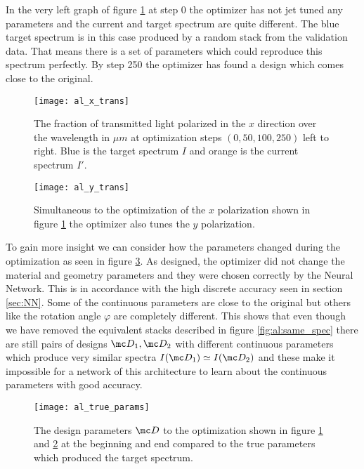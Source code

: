 \indent
In the very left graph of figure \ref{fig:al:x_trans} at step 0 the 
optimizer has not jet tuned any parameters and the current and target spectrum are quite different. The blue target spectrum is in this case produced by a random stack from the validation data. That means there is a set of parameters which could reproduce this spectrum perfectly. By step 250 the optimizer has found a design which comes close to the original.

\begin{figure}[H]
    \centering
    \texttt{[image: al\_x\_trans]}
    \caption{The fraction of transmitted light polarized in the $x$ direction over the wavelength in $\mu m$ at optimization steps 
    $(0, 50, 100, 250)$ left to right. Blue is the target spectrum $I$ and orange is the current spectrum $I'$. }
    \label{fig:al:x_trans}
\end{figure}

\begin{figure}[H]
    \centering
    \texttt{[image: al\_y\_trans]}
    \caption{Simultaneous to the optimization of the $x$ polarization shown in figure \ref{fig:al:x_trans} the optimizer also tunes the $y$ polarization.}
    \label{fig:al:y_trans}
\end{figure}

To gain more insight we can consider how the parameters changed during the optimization as seen in figure \ref{fig:al:true_params}. As designed, the optimizer did not change the material and geometry parameters and they were chosen correctly by the Neural Network. This is in accordance with the high discrete accuracy seen in section \ref{sec:NN}. Some of the continuous parameters are close to the original but others like the rotation angle $\varphi$ are completely different. This shows that even though we have removed the equivalent stacks described in figure \ref{fig:al:same_spec} there are still pairs of designs $\mc D_1, \mc D_2$ with different continuous parameters which produce very similar spectra $I \qty(\mc D_1) \simeq I \qty(\mc D_2)$ and these make it impossible for a network of this architecture to learn about the continuous parameters with good accuracy.

\begin{figure}[H]
    \centering
    \texttt{[image: al\_true\_params]}
    \caption{The design parameters $\mc D$ to the optimization shown in figure \ref{fig:al:x_trans} and \ref{fig:al:y_trans} at the beginning and end compared to the true parameters which produced the target spectrum.}
    \label{fig:al:true_params}
\end{figure} 